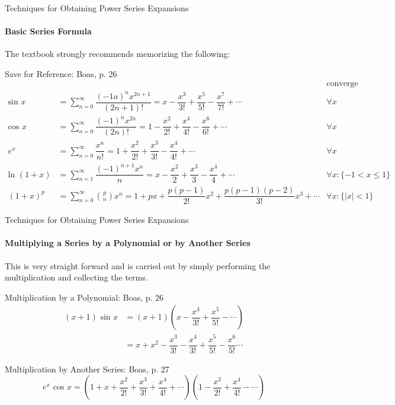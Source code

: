 \documentclass{beamer}
\begin{document}
\begin{frame}{Techniques for Obtaining Power Series Expansions}
	\framesubtitle{Basic Series Formula}
	The textbook strongly recommends memorizing the following:
	\begin{alertblock}{Save for Reference: Boas, p. 26}
	{\tiny\begin{align*}
	& & \mbox{converge} \\
	\mbox{sin\ }x &= \sum\limits_{n=0}^\infty\dfrac{(-1a)^nx^{2n+1}}{(2n+1)!} = x-\dfrac{x^3}{3!}+\dfrac{x^5}{5!}-\dfrac{x^7}{7!}+\cdots & \forall x \\
	\mbox{cos\ }x &= \sum\limits_{n=0}^\infty\dfrac{(-1)^nx^{2n}}{(2n)!} =  1-\dfrac{x^2}{2!}+\dfrac{x^4}{4!}-\dfrac{x^6}{6!}+\cdots & \forall x \\
	e^x &= \sum\limits_{n=0}^\infty\dfrac{x^n}{n!} = 1+\dfrac{x^2}{2!}+\dfrac{x^3}{3!}-\dfrac{x^4}{4!}+\cdots & \forall x \\
	\mbox{ln\ }(1+x) &= \sum\limits_{n=1}^\infty\dfrac{(-1)^{n+1}x^n}{n} = x-\dfrac{x^2}{2}+\dfrac{x^3}{3}-\dfrac{x^4}{4}+\cdots & \forall x:\{-1<x\leq 1\} \\
	(1+x)^p &= \sum\limits_{n=0}^\infty {p\choose n}x^n = 1+px+\dfrac{p(p-1)}{2!}x^2+\dfrac{p(p-1)(p-2)}{3!}x^3+\cdots & \forall x:\{ \lvert x\rvert < 1\}
	\end{align*}
	} %
	\end{alertblock}
\end{frame}
  
\begin{frame}{Techniques for Obtaining Power Series Expansions}
    	\framesubtitle{Multiplying a Series by a Polynomial or by Another Series}
    	This is very straight forward and is carried out by simply performing the multiplication and collecting the terms.
    	\begin{exampleblock}{Multiplication by a Polynomial: Boas, p. 26}
    	\begin{align*}
    	(x+1)\mbox{~sin\ } x &= (x+1)\left( x-\dfrac{x^3}{3!}+\dfrac{x^5}{5!}-\cdots\right) \\
    	&= x + x^2 - \dfrac{x^3}{3!}-\dfrac{x^4}{3!}+\dfrac{x^5}{5!}-\dfrac{x^6}{5!}\cdots
    	\end{align*}
    	\end{exampleblock}
    	\begin{exampleblock}{Multiplication by Another Series: Boas, p. 27}
	\[e^{x}\mbox{~cos\ }x = \left(1+x+\dfrac{x^{2}}{2!}+\dfrac{x^{3}}{3!}+\dfrac{x^{4}}{4!}+\cdots \right)\left(1-\dfrac{x^{2}}{2!}+\dfrac{x^{4}}{4!}-\cdots \right)\]
	\end{exampleblock}
\end{frame}
  
\end{document}
